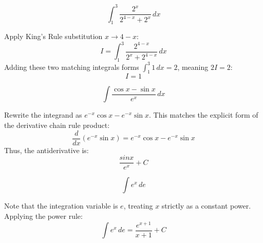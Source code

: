 \begin{questions}
\question
\[ \int_1^3 \frac{2^x}{2^{4-x} + 2^x} \,dx \]
\begin{solution}
Apply King's Rule substitution $x \to 4-x$:
\[ I = \int_1^3 \frac{2^{4-x}}{2^x + 2^{4-x}} \,dx \]
Adding these two matching integrals forms $\int_1^3 1 \,dx = 2$, meaning $2I = 2$:
\[ I = 1 \]
\end{solution}

\question
\[ \int \frac{\cos x - \sin x}{e^x} \,dx \]
\begin{solution}
Rewrite the integrand as $e^{-x}\cos x - e^{-x}\sin x$. This matches the explicit form of the derivative chain rule product:
\[ \frac{d}{dx} \left( e^{-x}\sin x \right) = e^{-x}\cos x - e^{-x}\sin x \]
Thus, the antiderivative is:
\[ \frac{sin x}{e^x} + C \]
\end{solution}

\question
\[ \int e^x \,de \]
\begin{solution}
Note that the integration variable is $e$, treating $x$ strictly as a constant power. Applying the power rule:
\[ \int e^x \,de = \frac{e^{x+1}}{x+1} + C \]
\end{solution}

\end{questions}

